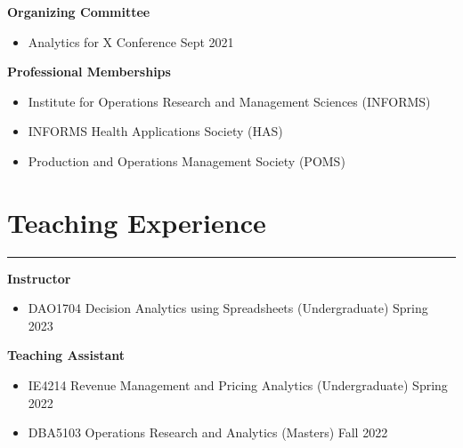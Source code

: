 \documentclass[12pt, a4paper]{article}
\begin{document}
{\raggedright\textbf{Organizing Committee}

\begin{itemize}[leftmargin=26pt, itemsep=2pt, parsep=0pt, topsep=-0.5em]
	\item Analytics for X Conference \hfill Sept 2021
\end{itemize}



\raggedright\textbf{Professional Memberships}

\begin{itemize}[leftmargin=26pt, itemsep=2pt, parsep=0pt, topsep=-0.5em]
	\item Institute for Operations Research and Management Sciences (INFORMS)
	\item INFORMS Health Applications Society (HAS)
	\item Production and Operations Management Society (POMS)
\end{itemize}




\section*{Teaching Experience}
\vspace*{0.4em}
\hrule height 0.5pt

\raggedright\textbf{Instructor}
\begin{itemize}[leftmargin=26pt, itemsep=2pt, parsep=0pt, topsep=-0.5em]

	\item DAO1704 Decision Analytics using Spreadsheets (Undergraduate) \hfill Spring 2023

\end{itemize}

\raggedright\textbf{Teaching Assistant}
\begin{itemize}[leftmargin=26pt, itemsep=2pt, parsep=0pt, topsep=-0.5em]

	\item IE4214 Revenue Management and Pricing Analytics (Undergraduate) \hfill Spring 2022

	\item DBA5103 Operations Research and Analytics (Masters) \hfill Fall 2022

\end{itemize}



}
\end{document}
